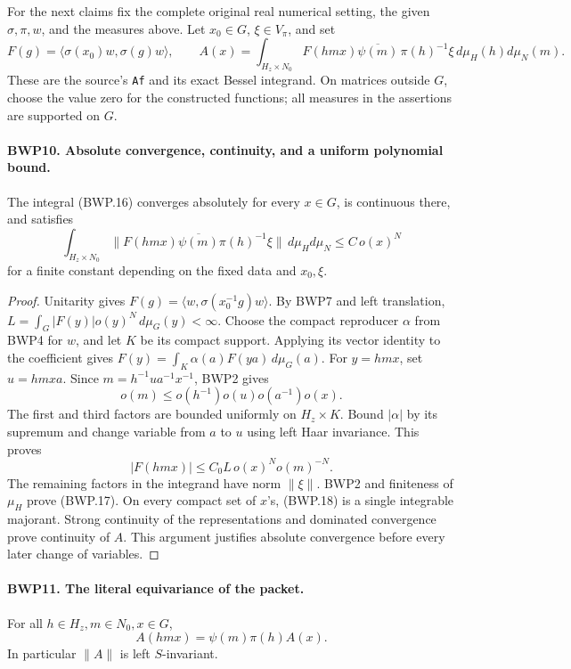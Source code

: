 For the next claims fix the complete original real numerical setting,
the given \(\sigma,\pi,w\), and the measures above.  Let
\(x_0\in G\), \(\xi\in V_\pi\), and set
\[
 F(g)=\langle\sigma(x_0)w,\sigma(g)w\rangle,\qquad
 A(x)=\int_{H_z\times N_0}
 F(hmx)\overline{\psi(m)}\,\pi(h)^{-1}\xi\,d\mu_H(h)d\mu_N(m).
 \tag{BWP.16}
\]
These are the source's \texttt{Af} and its exact Bessel integrand.
On matrices outside \(G\), choose the value zero for the constructed
functions; all measures in the assertions are supported on \(G\).

\paragraph{BWP10. Absolute convergence, continuity, and a uniform polynomial bound.}
\label{claim:BWP10}
The integral (BWP.16) converges absolutely for every \(x\in G\),
is continuous there, and satisfies
\[
 \int_{H_z\times N_0}\|F(hmx)\overline{\psi(m)}\pi(h)^{-1}\xi\|
 \,d\mu_Hd\mu_N\le C\,o(x)^N
 \tag{BWP.17}
\]
for a finite constant depending on the fixed data and \(x_0,\xi\).

\begin{proof}
Unitarity gives \(F(g)=\langle w,\sigma(x_0^{-1}g)w\rangle\).
By BWP7 and left translation,
\(L=\int_G|F(y)|o(y)^N\,d\mu_G(y)<\infty\).
Choose the compact reproducer \(\alpha\) from BWP4 for \(w\),
and let \(K\) be its compact support.  Applying its vector identity
to the coefficient gives
\(F(y)=\int_K\alpha(a)F(ya)\,d\mu_G(a)\).
For \(y=hmx\), set \(u=hmxa\).  Since
\(m=h^{-1}ua^{-1}x^{-1}\), BWP2 gives
\[
 o(m)\le o(h^{-1})o(u)o(a^{-1})o(x).
\]
The first and third factors are bounded uniformly on \(H_z\times K\).
Bound \(|\alpha|\) by its supremum and change variable from
\(a\) to \(u\) using left Haar invariance.  This proves
\[
 |F(hmx)|\le C_0L\,o(x)^N o(m)^{-N}.
 \tag{BWP.18}
\]
The remaining factors in the integrand have norm \(\|\xi\|\).
BWP2 and finiteness of \(\mu_H\) prove (BWP.17).
On every compact set of \(x\)'s, (BWP.18) is a single integrable
majorant.  Strong continuity of the representations and dominated
convergence prove continuity of \(A\).  This argument justifies
absolute convergence before every later change of variables.
\end{proof}

\paragraph{BWP11. The literal equivariance of the packet.}
\label{claim:BWP11}
For all \(h\in H_z,m\in N_0,x\in G\),
\[
 A(hmx)=\psi(m)\pi(h)A(x).
 \tag{BWP.19}
\]
In particular \(\|A\|\) is left \(S\)-invariant.


